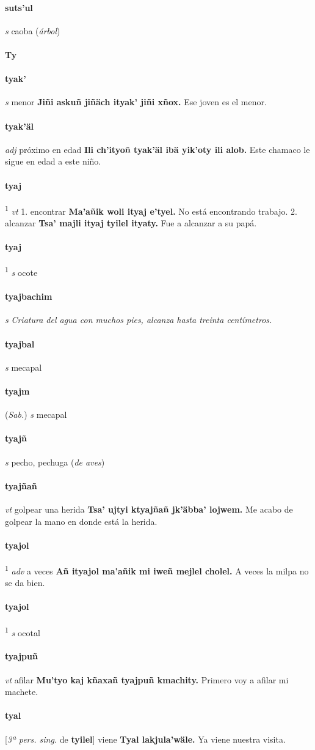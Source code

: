 \documentclass{scrbook}
\newcommand{\entry}[1]{\paragraph{#1}}
\newcommand{\alphaletter}[1]{\addsec{#1}}
\newcommand{\onedefinition}[1]{#1.}
\newcommand{\defsuperscript}[1]{\textsuperscript{1}}
\newcommand{\nontranslationdef}[1]{\textit{#1}}
\newcommand{\partofspeech}[1]{\textit{#1}}
\newcommand{\spanishtranslation}[1]{#1}
\newcommand{\clarification}[1]{(\textit{#1})}
\newcommand{\cholexample}[1]{\textbf{#1}}
\newcommand{\exampletranslation}[1]{#1}
\newcommand{\relevantdialect}[1]{(\textit{#1})}
\newcommand{\conjugationtense}[1]{[\textit{#1}}
\newcommand{\conjugationverb}[1]{de \textbf{#1}]}
\begin{document}
\begin{multicols}{2}
\entry{suts'ul}
\partofspeech{s}
\spanishtranslation{caoba}
\clarification{árbol}

\entry{Ty}
\alphaletter{Ty}

\entry{tyak'}
\partofspeech{s}
\spanishtranslation{menor}
\cholexample{Jiñi askuñ jiñäch ityak' jiñi xñox.}
\exampletranslation{Ese joven es el menor.}

\entry{tyak'äl}
\partofspeech{adj}
\spanishtranslation{próximo en edad}
\cholexample{Ili ch'ityoñ tyak'äl ibä yik'oty ili alob.}
\exampletranslation{Este chamaco le sigue en edad a este niño.}

\entry{tyaj}
\defsuperscript{1}
\partofspeech{vt}
\onedefinition{1}
\spanishtranslation{encontrar}
\cholexample{Ma'añik woli ityaj e'tyel.}
\exampletranslation{No está encontrando trabajo.}
\onedefinition{2}
\spanishtranslation{alcanzar}
\cholexample{Tsa' majli ityaj tyilel ityaty.}
\exampletranslation{Fue a alcanzar a su papá.}

\entry{tyaj}
\defsuperscript{2}
\partofspeech{s}
\spanishtranslation{ocote}

\entry{tyajbachim}
\partofspeech{s}
\nontranslationdef{Criatura del agua con muchos pies, alcanza hasta treinta centímetros.}

\entry{tyajbal}
\partofspeech{s}
\spanishtranslation{mecapal}

\entry{tyajm}
\relevantdialect{Sab.}
\partofspeech{s}
\spanishtranslation{mecapal}

\entry{tyajñ}
\partofspeech{s}
\spanishtranslation{pecho, pechuga}
\clarification{de aves}

\entry{tyajñañ}
\partofspeech{vt}
\spanishtranslation{golpear una herida}
\cholexample{Tsa' ujtyi ktyajñañ jk'äbba' lojwem.}
\exampletranslation{Me acabo de golpear la mano en donde está la herida.}

\entry{tyajol}
\defsuperscript{1}
\partofspeech{adv}
\spanishtranslation{a veces}
\cholexample{Añ ityajol ma'añik mi iweñ mejlel cholel.}
\exampletranslation{A veces la milpa no se da bien.}

\entry{tyajol}
\defsuperscript{2}
\partofspeech{s}
\spanishtranslation{ocotal}

\entry{tyajpuñ}
\partofspeech{vt}
\spanishtranslation{afilar}
\cholexample{Mu'tyo kaj kñaxañ tyajpuñ kmachity.}
\exampletranslation{Primero voy a afilar mi machete.}

\entry{tyal}
\conjugationtense{3ª pers. sing.}
\conjugationverb{tyilel}
\spanishtranslation{viene}
\cholexample{Tyal lakjula'wäle.}
\exampletranslation{Ya viene nuestra visita.}


\end{multicols}
\end{document}
